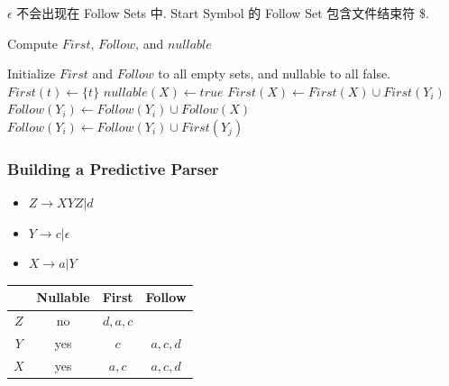 $\epsilon$ 不会出现在 Follow Sets 中. Start Symbol 的 Follow Set 包含文件结束符 \$. 

\begin{algorithm}[H]
    \caption{Compute $First$, $Follow$, and $nullable$}
    \begin{algorithmic}
        \State Initialize $First$ and $Follow$ to all empty sets, and nullable to all false.
            \State $First(t)\gets \{ t \}$
        \EndFor
        \Repeat
                        \State $nullable(X)\gets true$
                    \EndIf
                        \State $First(X)\gets First(X)\cup First(Y_i)$
                    \EndIf
                        \State $Follow(Y_i)\gets Follow(Y_i)\cup Follow(X)$
                    \EndIf
                        \State $Follow(Y_i)\gets Follow(Y_i)\cup First(Y_j)$
                    \EndIf
                \EndFor
            \EndFor
    \end{algorithmic}
\end{algorithm}

\subsubsection{Building a Predictive Parser}
\begin{itemize}
    \item $Z\to XYZ | d$
    \item $Y\to c | \epsilon $
    \item $X\to a | Y$
\end{itemize}
\begin{table}[!htb]
    \centering
    \begin{tabular}[c]{cccc}\toprule
        & Nullable & First & Follow \\ \midrule
        $Z$ & no  & $d,a,c$ & \\ \cmidrule{1-1}
        $Y$ & yes & $c$ & $a,c,d $\\ \cmidrule{1-1}
        $X$ & yes & $a,c$ & $a,c,d$\\
        \bottomrule
    \end{tabular}
\end{table}


